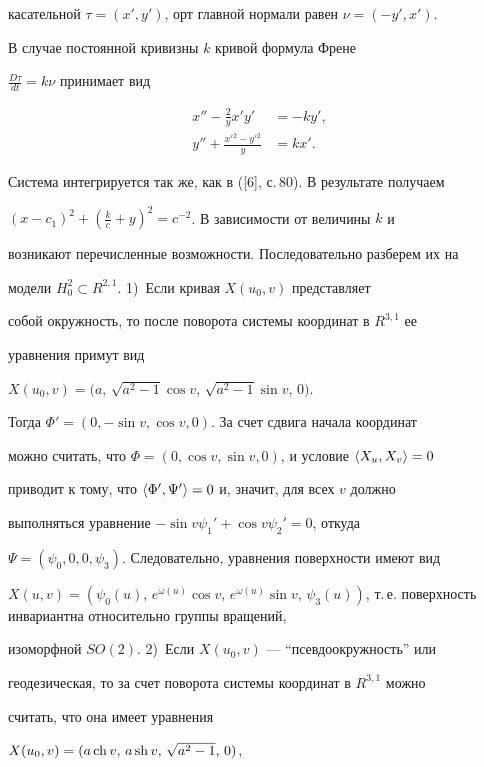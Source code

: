 \begin{pf}
касательной $\tau =(x',y')$, орт главной нормали равен $\nu =(-y',x')$.


В случае постоянной кривизны $k$ кривой формула Френе


$\frac{D\tau}{dt}=k\nu$ принимает вид


\begin{align*}


x''-\frac{2}{y}x'y'&=-ky',\\


y''+\frac{x'{}^2-y'{}^2}{y}&=kx'.


\end{align*}


Система интегрируется так же, как в ([6], с.\,80). В результате получаем


$(x{-}c_1)^2{+}(\frac{k}{c}{+}y)^2{=}c^{-2}$. В зависимости от величины $k$ и


возникают перечисленные возможности. Последовательно разберем их на


модели $H^2_0 \subset R^{2,1}$. 1)~Если кривая $X(u_0,v)$ представляет


собой окружность, то после поворота системы координат в $R^{3,1}$ ее


уравнения примут вид


$X(u_0,v)=(a,\,\sqrt{a^2-1}\cos v$, $\sqrt{a^2-1}\sin v,\,0)$.




Тогда $\Phi '=(0,-\sin v,\cos v,0)$. За счет сдвига начала координат


можно считать, что $\Phi=(0,\cos v,\sin v,0)$, и условие $\langle X_u,X_v\rangle=0$


приводит к тому, что $\langle\Phi ',\Psi '\rangle=0$ и, значит, для всех $v$ должно


выполняться уравнение $-\sin v\psi_1'+\cos v\psi_2'=0$, откуда


$\Psi=(\psi_0,0,0,\psi_3)$. Следовательно, уравнения поверхности имеют вид


$X(u,v)=(\psi_0(u),\,e^{\omega (u)}\cos v,\,e^{\omega (u)}\sin v,\,


\psi_3(u))$, т.\,е. поверхность инвариантна относительно группы вращений,


изоморфной $SO(2)$. 2)~Если $X(u_0,v)$ --- ``псевдоокружность'' или


геодезическая, то за счет поворота системы координат в $R^{3,1}$ можно


считать, что она имеет уравнения


$X(u_0,v)=(a\operatorname{ch} v,\, a\operatorname{sh} v,\,\sqrt{a^2-1},\,0)$,



\end{pf}
